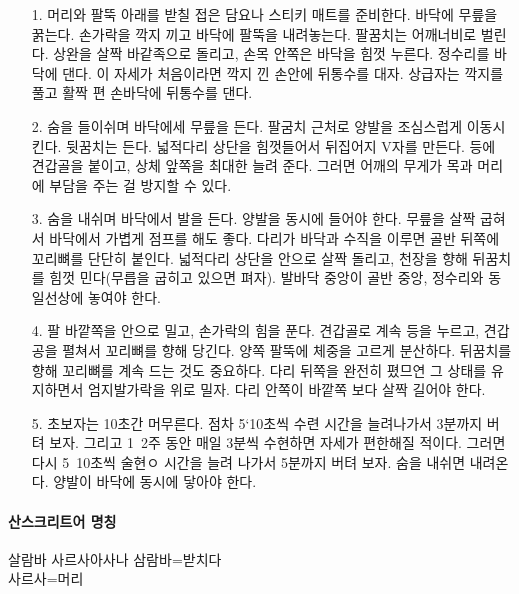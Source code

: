 \documentclass[12pt, a4paper, oneside]{book}
\begin{document}
			\begin{itemize}[topsep=0.0em, parsep=0.0em, itemsep=0em, leftmargin=6.0em, labelwidth=3em, labelsep=3em] 
			\item [1.] 머리와 팔뚝 아래를 받칠 접은 담요나 스티키 매트를 준비한다.
					바닥에 무릎을 꿁는다.
					손가락을 깍지 끼고 바닥에 팔뚝을 내려놓는다.
					팔꿈치는 어깨너비로 벌린다.
					상완을 살짝 바같족으로 돌리고, 손목 안쪽은 바닥을 힘껏 누른다.
					정수리를 바닥에 댄다.
					이 자세가 처음이라면 깍지 낀 손안에 뒤통수를 대자.
					상급자는 깍지를 풀고 활짝 편 손바닥에 뒤통수를 댄다.
			\item [2.] 
					숨을 들이쉬며 바닥에세 무릎을 든다. 팔굼치 근처로 양발을 조심스럽게 이동시킨다.
					뒷꿈치는 든다.
					넓적다리 상단을 힘껏들어서 뒤집어지 V자를 만든다.
					등에 견갑골을 붙이고, 상체 앞쪽을 최대한 늘려 준다.
					그러면 어깨의 무게가 목과 머리에 부담을 주는 걸 방지할 수 있다.
			\item [3.] 
					숨을 내쉬며 바닥에서 발을 든다.
					양발을 동시에 들어야 한다.
					무릎을 살짝 굽혀서 바닥에서 가볍게 점프를 해도 좋다. 
					다리가 바닥과 수직을 이루면 골반 뒤쪽에 꼬리뼈를 단단히 붙인다.
					넓적다리 상단을 안으로 살짝 돌리고, 천장을 향해 뒤꿈치를 힘껏 민다(무릅을 굽히고 있으면 펴자).
					발바닥 중앙이 골반 중앙, 정수리와 동일선상에 놓여야 한다.
			\item [4.] 
					팔 바깥쪽을 안으로 밀고, 손가락의 힘을 푼다.
					견갑골로 계속 등을 누르고, 견갑공을 펼쳐서 꼬리뼈를 향해 당긴다.
					양쪽 팔뚝에 체중을 고르게 분산하다.
					뒤꿈치를 향해 꼬리뼈를 계속 드는 것도 중요하다.
					다리 뒤쪽을 완전히 폈므연 그 상태를 유지하면서 엄지발가락을 위로 밀자.
					다리 안쪽이 바깥쪽 보다 살짝 길어야 한다.

			\item [5.] 
					초보자는 10초간 머무른다.
					점차 5`10초씩 수련 시간을 늘려나가서 3분까지 버텨 보자.
					그리고 1~2주 동안 매일 3분씩 수현하면 자세가 편한해질 적이다.
					그러면 다시 5~10초씩 술현ㅇ 시간을 늘려 나가서 5분까지 버텨 보자.
					숨을 내쉬면 내려온다.
					양발이 바닥에 동시에 닿아야 한다.





			\end{itemize}


\paragraph{산스크리트어 명칭}

			살람바 사르사아사나
			삼람바=받치다\\
			사르사=머리\\
\end{document}
